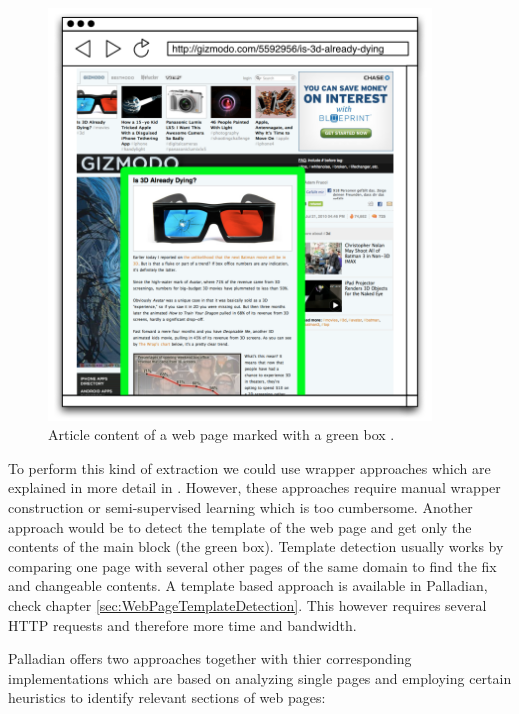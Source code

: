 \begin{figure}[ht!]
\centering
\includegraphics[width=4in]{img/webpagecontentextractor.png}
\caption{Article content of a web page marked with a green box  \cite{katz2010diploma}.}
\label{fig:webpagecontentextractor}
\end{figure}

To perform this kind of extraction we could use wrapper approaches which are explained in more detail in \cite{ckgs2006}. However, these approaches require manual wrapper construction or semi-supervised learning which is too cumbersome.
Another approach would be to detect the template of the web page and get only the contents of the main block (the green box). Template detection usually works by comparing one page with several other pages of the same domain to find the fix and changeable contents. A template based approach is available in Palladian, check chapter \ref{sec:WebPageTemplateDetection}. This however requires several HTTP requests and therefore more time and bandwidth.

Palladian offers two approaches together with thier corresponding implementations which are based on analyzing single pages and employing certain heuristics to identify relevant sections of web pages:

